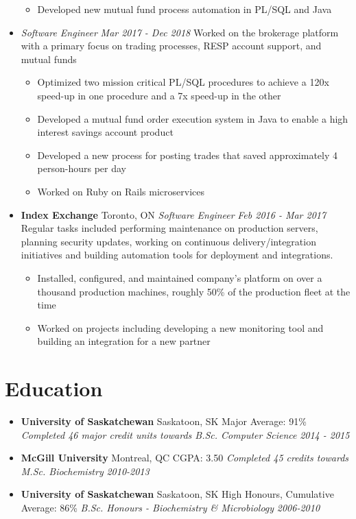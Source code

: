\documentclass[letterpaper,11pt]{article}
\newcommand{\resumeSubHeading}[4]{
  \item[]
      \textbf{#1} \hfill #2 \newline
      \textit{#3} \hfill \textit{#4}
}
\newcommand{\jobAtSamePlace}[2]{
  \item[]
      \textit{#1} \hfill \textit{#2}
}
\newcommand{\resumeSubHeadingEducation}[5]{
  \item[]
      \textbf{#1} \hfill #2 \newline
      #3 \newline
      \textit{#4} \hfill \textit{#5}
}
\begin{document}
\begin{itemize}[leftmargin=*]
      \begin{itemize}[noitemsep,topsep=0pt]
        \item Developed new mutual fund process automation in PL/SQL and Java
      \end{itemize}
      \jobAtSamePlace
      {Software Engineer}{Mar 2017 - Dec 2018}\newline
      Worked on the brokerage platform with a primary focus on trading processes, RESP account support, and mutual funds
      \begin{itemize}[noitemsep,topsep=0pt]
        \item Optimized two mission critical PL/SQL procedures to achieve a 120x speed-up in one procedure and a 7x speed-up in the other
        \item Developed a mutual fund order execution system in Java to enable a high interest savings account product
        \item Developed a new process for posting trades that saved approximately 4 person-hours per day
        \item Worked on Ruby on Rails microservices
      \end{itemize}
      
  \resumeSubHeading
      {Index Exchange}{Toronto, ON}
      {Software Engineer}{Feb 2016 - Mar 2017}\newline
      Regular tasks included performing maintenance on production servers, planning security updates, working on continuous delivery/integration initiatives and building automation tools for deployment and integrations.
      \begin{itemize}[noitemsep,topsep=0pt]
        \item Installed, configured, and maintained company's platform on over a thousand production machines, roughly 50\% of the production fleet at the time
        \item Worked on projects including developing a new monitoring tool and building an integration for a new partner
      \end{itemize}    
\end{itemize}

\section{Education}
  \begin{itemize}[leftmargin=*]
      \resumeSubHeadingEducation
        {University of Saskatchewan}{Saskatoon, SK}
        {Major Average: 91\%}
        {Completed 46 major credit units towards B.Sc. Computer Science}{2014 - 2015}
      \resumeSubHeadingEducation
        {McGill University}{Montreal, QC}
        {CGPA: 3.50}
        {Completed 45 credits towards M.Sc. Biochemistry}{2010-2013}
      \resumeSubHeadingEducation
        {University of Saskatchewan}{Saskatoon, SK}
        {High Honours, Cumulative Average: 86\%}
        {B.Sc. Honours - Biochemistry \& Microbiology}{2006-2010}
     \end{itemize}
\end{document}
